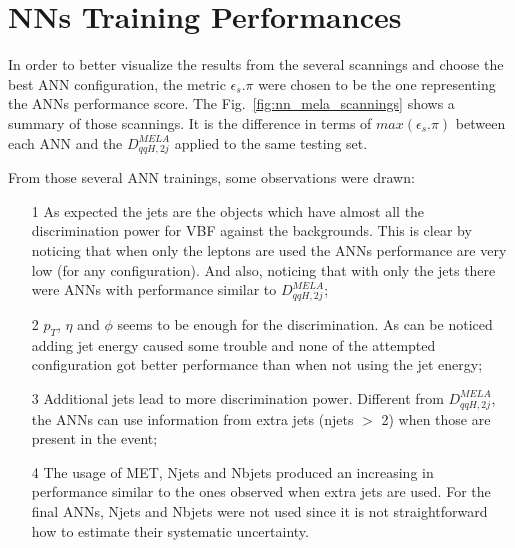\section{NNs Training Performances}
In order to better visualize the results from the several scannings and choose the best ANN configuration, the metric $\epsilon_{s}.\pi$ were chosen to be the one representing the ANNs performance score. The Fig.~\ref{fig:nn_mela_scannings} shows a summary of those scannings. It is the difference in terms of $max(\epsilon_{s}.\pi)$ between each ANN and the $D_{qqH, 2j}^{MELA}$ applied to the same testing set.

From those several ANN trainings, some observations were drawn:
\begin{itemize}
	\item[1] As expected the jets are the objects which have almost all the discrimination power for VBF against the backgrounds. This is clear by noticing that when only the leptons are used the ANNs performance are very low (for any configuration). And also, noticing that with only the jets there were ANNs with performance similar to $D_{qqH,2j}^{MELA}$;
	\item[2] $p_{T}$, $\eta$ and $\phi$ seems to be enough for the discrimination. As can be noticed adding jet energy caused some trouble and none of the attempted configuration got better performance than when not using the jet energy;
	\item[3] Additional jets lead to more discrimination power. Different from $D_{qqH,2j}^{MELA}$, the ANNs can use information from extra jets (njets $>$ 2) when those are present in the event;
	\item[4] The usage of MET, Njets and Nbjets produced an increasing in performance similar to the ones observed when extra jets are used. For the final ANNs, Njets and Nbjets were not used since it is not straightforward how to estimate their systematic uncertainty.
\end{itemize}

